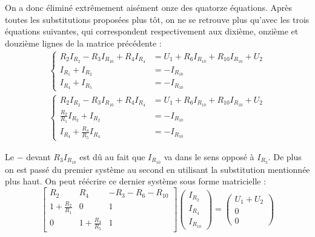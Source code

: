 \documentclass{article}
\begin{document}
On a donc éliminé extrêmement aisément onze des quatorze équations. Après toutes les substitutions proposées plus tôt, on ne se retrouve plus qu'avec les trois équations suivantes, qui correspondent respectivement aux dixième, onzième et douzième lignes de la matrice précédente :
\begin{align*}\left\{\begin{aligned}
    R_2 I_{R_2} - R_3 I_{R_{10}} + R_4 I_{R_4} &= U_1 + R_6 I_{R_{10}} + R_{10} I_{R_{10}} + U_2\\
    I_{R_1} + I_{R_2} &= -I_{R_{10}}\\
    I_{R_4} + I_{R_5} &= -I_{R_{10}}
\end{aligned}\right.\\
\left\{\begin{aligned}
    R_2 I_{R_2} - R_3 I_{R_{10}} + R_4 I_{R_4} &= U_1 + R_6 I_{R_{10}} + R_{10} I_{R_{10}} + U_2\\
    \frac{R_2}{R_1} I_{R_2} + I_{R_2} &= -I_{R_{10}}\\
    I_{R_4} + \frac{R_4}{R_5} I_{R_4} &= -I_{R_{10}}
\end{aligned}\right.\end{align*}

Le $-$ devant $R_3 I_{R_{10}}$ est dû au fait que $I_{R_{10}}$ va dans le sens opposé à $I_{R_3}$. De plus on est passé du premier système au second en utilisant la substitution mentionnée plus haut. On peut réécrire ce dernier système sous forme matricielle :
\[
\begin{bmatrix}
R_2 & R_4 & -R_3 - R_6 - R_{10} \\
1+\frac{R_2}{R_1} & 0 & 1 \\
0 & 1+\frac{R_4}{R_5} & 1
\end{bmatrix}
\begin{pmatrix}
I_{R_2} \\ I_{R_4} \\ I_{R_{10}}
\end{pmatrix}=
\begin{pmatrix}
U_1 + U_2 \\ 0 \\ 0
\end{pmatrix}
\]
\end{document}
